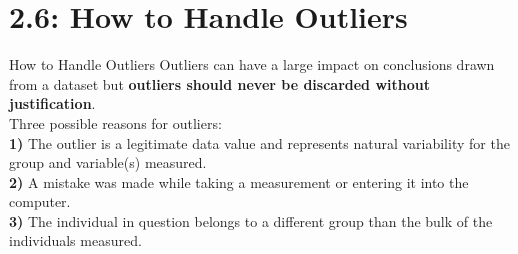 \documentclass[Lecture.tex]{subfiles}
\begin{document}
\section{2.6: How to Handle Outliers}

\begin{frame}{How to Handle Outliers}
Outliers can have a large impact on conclusions drawn from a dataset but {\bf outliers should never be discarded without justification}.\\ \pause
Three possible reasons for outliers:\\ \pause
{\bf 1)} The outlier is a legitimate data value and represents natural variability for the group and variable(s) measured.\\ \pause
\vspace{.1in}
{\bf 2)} A mistake was made while taking a measurement or entering it into the computer.\\ \pause
\vspace{.1in}
{\bf 3)} The individual in question belongs to a different group than the bulk of the individuals measured.
\end{frame}
\end{document}
